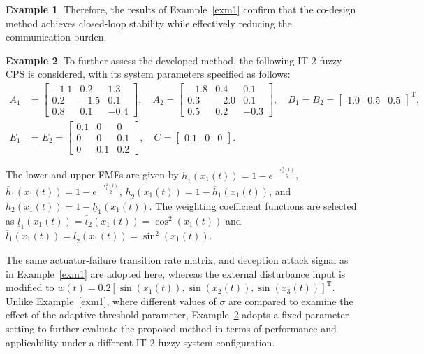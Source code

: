 \documentclass[preprint,review,fleqn,sort&compress,3p]{elsarticle}
\theoremstyle{definition} %
\theoremstyle{definition}%
\newtheorem{example}{Example}
\begin{document}
\begin{example}
Therefore, the results of Example~\ref{exm1} confirm that the co-design method achieves closed-loop stability while effectively reducing the communication burden.

\end{example}

\begin{example}\label{exm2}
To further assess the developed method, the following IT-2 fuzzy CPS is considered, with its system parameters specified as follows:
\begin{align*}
	A_1 &= \begin{bmatrix}
		-1.1 & 0.2 & 1.3 \\
		0.2 & -1.5 & 0.1 \\
		0.8 & 0.1 & -0.4
	\end{bmatrix}, \quad
	A_2 = \begin{bmatrix}
		-1.8 & 0.4 & 0.1 \\
		0.3 & -2.0 & 0.1 \\
		0.5 & 0.2 & -0.3
	\end{bmatrix}, \quad
	B_1 = B_2 = \begin{bmatrix} 1.0 & 0.5 & 0.5 \end{bmatrix}^{\mathrm{T}}, \\
	E_1 &= E_2 =
	\begin{bmatrix}
		0.1 & 0 & 0 \\
		0 & 0 & 0.1 \\
		0 & 0.1 & 0.2
	\end{bmatrix}, \quad
	C = \begin{bmatrix} 0.1 & 0 & 0 \end{bmatrix}.
\end{align*}

The lower and upper FMFs are given by $\underline{h}_1(x_1(t)) = 1 - e^{-\frac{x_1^2(t)}{5}}$, $\overline{h}_1(x_1(t)) = 1 - e^{-\frac{x_1^2(t)}{2}}$, $\underline{h}_2(x_1(t)) = 1 - \overline{h}_1(x_1(t))$, and $\overline{h}_2(x_1(t)) = 1 - \underline{h}_1(x_1(t))$. The weighting coefficient functions are selected as $\underline{l}_1(x_1(t))=\overline{l}_2(x_1(t))=\cos^{2}(x_1(t))$ and $\overline{l}_1(x_1(t))=\underline{l}_2(x_1(t))=\sin^{2}(x_1(t))$. 

The same actuator-failure transition rate matrix, and deception attack signal as in Example~\ref{exm1} are adopted here, whereas the external disturbance input is modified to $w(t) = 0.2[\sin(x_1(t)),\sin(x_2(t)),\sin(x_3(t))]^{\mathrm{T}}$. Unlike Example~\ref{exm1}, where different values of $\sigma$ are compared to examine the effect of the adaptive threshold parameter, Example~\ref{exm2} adopts a fixed parameter setting to further evaluate the proposed method in terms of performance and applicability under a different IT-2 fuzzy system configuration.


\end{example}
\end{document}
